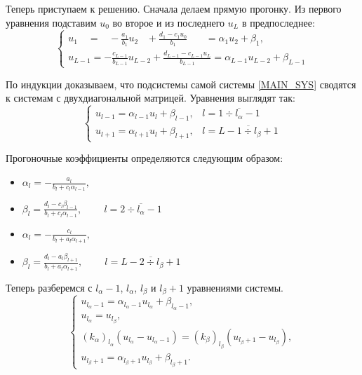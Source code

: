 		Теперь приступаем к решению. Сначала делаем прямую прогонку. Из первого уравнения подставим $u_0$ во второе и из последнего $u_L$ в предпоследнее:
		\begin{equation*}
			\begin{cases}
				u_1 	\;\;\;\,  = \;\;\;  -\frac{a_1}{b_1} u_2 \;\;\; + \frac{d_1 - c_1 u_0}{b_1} \;\;\;\;\;\;\, = \alpha_1 u_2 + \beta_1, \\
				u_{L - 1} = -\frac{c_{L - 1}}{b_{L - 1}}u_{L - 2} + \frac{d_{L - 1} - c_{L - 1} u_L}{b_{L - 1}} = \alpha_{L - 1} u_{L - 2} + \beta_{L - 1}
			\end{cases}
		\end{equation*}
		
		По индукции доказываем, что подсистемы самой системы \eqref{MAIN_SYS} сводятся к системам с двухдиагональной матрицей. Уравнения выглядят так:
		\begin{equation}
			\begin{cases}
				u_{l - 1} = \alpha_{l - 1} u_l + \beta_{l - 1}, \;\;\; l = \overline{1 \div l_\alpha - 1} \\
				u_{l + 1} = \alpha_{l + 1} u_l + \beta_{l + 1}, \;\;\; l = \overline{L - 1 \div l_\beta + 1}
			\end{cases}
			\label{BACKWARD}
		\end{equation}
		
		Прогоночные коэффициенты определяются следующим образом:
		\begin{itemize}
			\item $\alpha_l = -\displaystyle\frac{a_l}{b_l + c_l \alpha_{l-1}},$
			
			\item $\beta_l  =  \displaystyle\frac{d_l - c_l \beta_{l-1}}{b_l + c_l \alpha_{l - 1}}, \;\;\;\;\;\;\;\; l = \overline{2 \div l_\alpha - 1}$
		\end{itemize}
		
		\vspace{20mm}
		
		\begin{itemize}
			\item $\alpha_l = -\displaystyle\frac{c_l}{b_l + a_l \alpha_{l+1}},$
			
			\item $\beta_l  =  \displaystyle\frac{d_l - a_l \beta_{l+1}}{b_l + a_l \alpha_{l + 1}}, \;\;\;\;\;\;\;\; l = \overline{L - 2 \div l_\beta + 1}$
		\end{itemize}		
		
		
		\newpage
		Теперь разберемся с $l_{\alpha} - 1$, $l_\alpha$, $l_\beta$ и $l_{\beta} + 1$ уравнениями системы.
		\begin{equation*}
			\begin{cases}
				u_{l_\alpha - 1} = \alpha_{l_\alpha - 1} u_{l_\alpha} + \beta_{l_\alpha - 1}, \\
				u_{l_\alpha} = u_{l_\beta}, \\
				(k_\alpha)_{l_\alpha}(u_{l_\alpha} - u_{l_\alpha - 1}) = (k_\beta)_{l_\beta}(u_{l_\beta + 1} - u_{l_\beta}), \\
				u_{l_\beta  + 1} = \alpha_{l_\beta  + 1} u_{l_\beta}  + \beta_{l_\beta  + 1}.
			\end{cases}
		\end{equation*}
		
